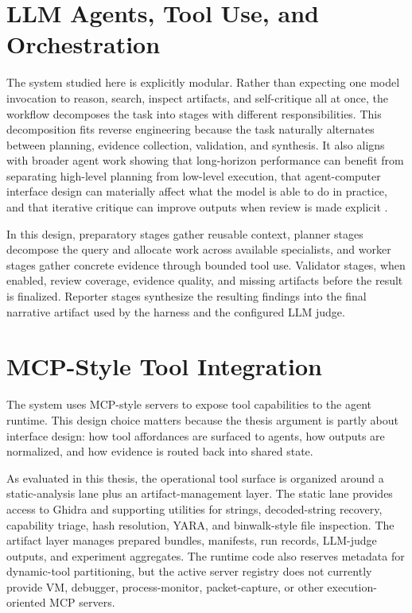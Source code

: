 \section{LLM Agents, Tool Use, and Orchestration}

The system studied here is explicitly modular. Rather than expecting one model invocation to reason, search, inspect artifacts, and self-critique all at once, the workflow decomposes the task into stages with different responsibilities. This decomposition fits reverse engineering because the task naturally alternates between planning, evidence collection, validation, and synthesis. It also aligns with broader agent work showing that long-horizon performance can benefit from separating high-level planning from low-level execution, that agent-computer interface design can materially affect what the model is able to do in practice, and that iterative critique can improve outputs when review is made explicit \cite{erdogan2025planandactimprovingplanningagents,yang2024sweagentagentcomputerinterfacesenable,madaan2023selfrefineiterativerefinementselffeedback,gou2024criticlargelanguagemodels}.

In this design, preparatory stages gather reusable context, planner stages decompose the query and allocate work across available specialists, and worker stages gather concrete evidence through bounded tool use. Validator stages, when enabled, review coverage, evidence quality, and missing artifacts before the result is finalized. Reporter stages synthesize the resulting findings into the final narrative artifact used by the harness and the configured LLM judge.

\section{MCP-Style Tool Integration}

The system uses MCP-style servers to expose tool capabilities to the agent runtime. This design choice matters because the thesis argument is partly about interface design: how tool affordances are surfaced to agents, how outputs are normalized, and how evidence is routed back into shared state.

As evaluated in this thesis, the operational tool surface is organized around a static-analysis lane plus an artifact-management layer. The static lane provides access to Ghidra and supporting utilities for strings, decoded-string recovery, capability triage, hash resolution, YARA, and binwalk-style file inspection. The artifact layer manages prepared bundles, manifests, run records, LLM-judge outputs, and experiment aggregates. The runtime code also reserves metadata for dynamic-tool partitioning, but the active server registry does not currently provide VM, debugger, process-monitor, packet-capture, or other execution-oriented MCP servers.

